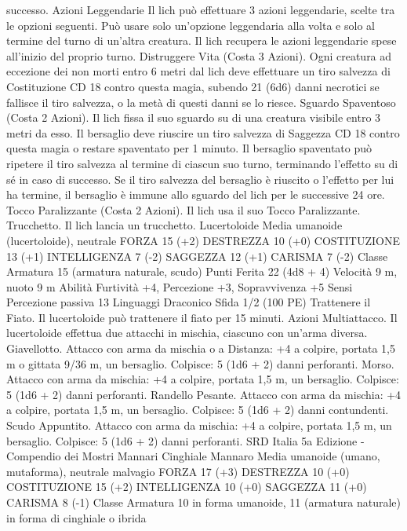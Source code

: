 \begin{multicols}{2}
successo.
Azioni Leggendarie
Il lich può effettuare 3 azioni leggendarie, scelte tra le opzioni
seguenti. Può usare solo un’opzione leggendaria alla volta e solo
al termine del turno di un’altra creatura. Il lich recupera le azioni
leggendarie spese all’inizio del proprio turno.
Distruggere Vita (Costa 3 Azioni). Ogni creatura ad eccezione
dei non morti entro 6 metri dal lich deve effettuare un tiro
salvezza di Costituzione CD 18 contro questa magia, subendo 21
(6d6) danni necrotici se fallisce il tiro salvezza, o la metà di
questi danni se lo riesce.
Sguardo Spaventoso (Costa 2 Azioni). Il lich fissa il suo sguardo
su di una creatura visibile entro 3 metri da esso. Il bersaglio deve
riuscire un tiro salvezza di Saggezza CD 18 contro questa magia
o restare spaventato per 1 minuto. Il bersaglio spaventato può
ripetere il tiro salvezza al termine di ciascun suo turno,
terminando l’effetto su di sé in caso di successo. Se il tiro
salvezza del bersaglio è riuscito o l’effetto per lui ha termine, il
bersaglio è immune allo sguardo del lich per le successive 24
ore.
Tocco Paralizzante (Costa 2 Azioni). Il lich usa il suo Tocco
Paralizzante.
Trucchetto. Il lich lancia un trucchetto.
Lucertoloide
Media umanoide (lucertoloide), neutrale
FORZA 15 (+2)
DESTREZZA 10 (+0)
COSTITUZIONE 13 (+1)
INTELLIGENZA 7 (-2)
SAGGEZZA 12 (+1)
CARISMA 7 (-2)
Classe Armatura 15 (armatura naturale, scudo)
Punti Ferita 22 (4d8 + 4)
Velocità 9 m, nuoto 9 m
Abilità Furtività +4, Percezione +3, Sopravvivenza +5
Sensi Percezione passiva 13
Linguaggi Draconico
Sfida 1/2 (100 PE)
Trattenere il Fiato. Il lucertoloide può trattenere il fiato per 15
minuti.
Azioni
Multiattacco. Il lucertoloide effettua due attacchi in mischia,
ciascuno con un’arma diversa.
Giavellotto. Attacco con arma da mischia o a Distanza: +4 a
colpire, portata 1,5 m o gittata 9/36 m, un bersaglio.
Colpisce: 5 (1d6 + 2) danni perforanti.
Morso. Attacco con arma da mischia: +4 a colpire, portata 1,5
m, un bersaglio.
Colpisce: 5 (1d6 + 2) danni perforanti.
Randello Pesante. Attacco con arma da mischia: +4 a colpire,
portata 1,5 m, un bersaglio.
Colpisce: 5 (1d6 + 2) danni contundenti.
Scudo Appuntito. Attacco con arma da mischia: +4 a colpire,
portata 1,5 m, un bersaglio.
Colpisce: 5 (1d6 + 2) danni perforanti.
SRD Italia 5a Edizione - Compendio dei Mostri
Mannari
Cinghiale Mannaro
Media umanoide (umano, mutaforma), neutrale malvagio
FORZA 17 (+3)
DESTREZZA 10 (+0)
COSTITUZIONE 15 (+2)
INTELLIGENZA 10 (+0)
SAGGEZZA 11 (+0)
CARISMA 8 (-1)
Classe Armatura 10 in forma umanoide, 11 (armatura naturale)
in forma di cinghiale o ibrida

\end{multicols}

